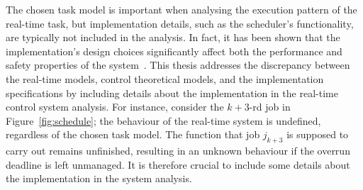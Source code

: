 The chosen task model is important when analysing the execution pattern of the real-time task, but implementation details, such as the scheduler's functionality, are typically not included in the analysis.
In fact, it has been shown that the implementation's design choices significantly affect both the performance and safety properties of the system~\cite{Cervin:2005}.
This thesis addresses the discrepancy between the real-time models, control theoretical models, and the implementation specifications by including details about the implementation in the real-time control system analysis.
For instance, consider the $k+3$-rd job in Figure~\ref{fig:schedule}; the behaviour of the real-time system is undefined, regardless of the chosen task model.
The function that job $j_{k+3}$ is supposed to carry out remains unfinished, resulting in an unknown behaviour if the overrun deadline is left unmanaged.
It is therefore crucial to include some details about the implementation in the system analysis.

